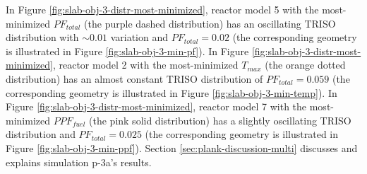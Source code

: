 In Figure \ref{fig:slab-obj-3-distr-most-minimized}, reactor model 5 with the
most-minimized $PF_{total}$ (the purple dashed distribution) has an oscillating TRISO 
distribution with $\sim0.01$ variation and $PF_{total} = 0.02$ 
(the corresponding geometry is illustrated in Figure \ref{fig:slab-obj-3-min-pf}).
In Figure \ref{fig:slab-obj-3-distr-most-minimized}, reactor model 2 with the 
most-minimized $T_{max}$ (the orange dotted distribution) has an almost constant TRISO 
distribution of $PF_{total}=0.059$ (the corresponding geometry is illustrated in Figure 
\ref{fig:slab-obj-3-min-temp}). 
In Figure \ref{fig:slab-obj-3-distr-most-minimized}, reactor model 7 with the
most-minimized $PPF_{fuel}$ (the pink solid distribution) has a 
slightly oscillating TRISO distribution and $PF_{total} = 0.025$ 
(the corresponding geometry is illustrated in Figure \ref{fig:slab-obj-3-min-ppf}).
Section \ref{sec:plank-discussion-multi} discusses and explains simulation p-3a's results.

